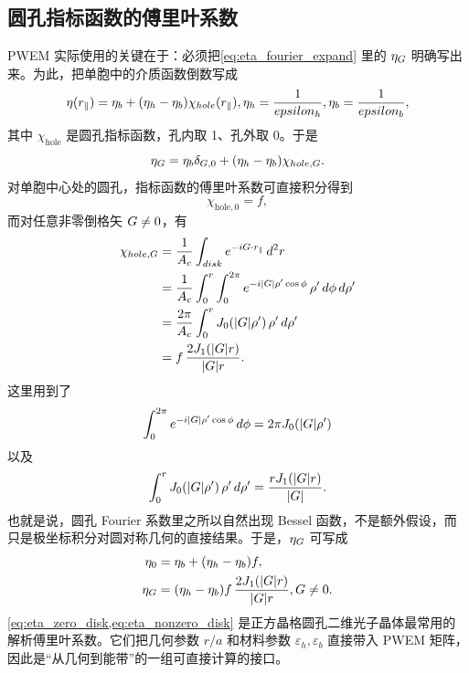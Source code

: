 \subsection{圆孔指标函数的傅里叶系数}
PWEM 实际使用的关键在于：必须把\cref{eq:eta_fourier_expand} 里的 $\eta_{G}$ 明确写出来。为此，把单胞中的介质函数倒数写成
\begin{equation}
\eta(\rvec_{\parallel})=
\eta_b + (\eta_h-\eta_b)\chi_{\mathrm{hole}}(\rvec_{\parallel}),
\qquad
\eta_h=\frac{1}{\varepsilon_h},\quad
\eta_b=\frac{1}{\varepsilon_b},
\label{eq:eta_indicator_disk}
\end{equation}
其中 $\chi_{\mathrm{hole}}$ 是圆孔指标函数，孔内取 1、孔外取 0。于是
\begin{equation}
\eta_{G}
=
\eta_b\delta_{G,0}
+
(\eta_h-\eta_b)
\chi_{hole,G}.
\label{eq:eta_g_from_indicator}
\end{equation}
对单胞中心处的圆孔，指标函数的傅里叶系数可直接积分得到
\begin{equation}
\chi_{\mathrm{hole},0}=f,
\label{eq:chi_disk_zero}
\end{equation}
而对任意非零倒格矢 $G\neq 0$，有
\begin{equation}
\begin{aligned}
\chi_{hole,G}
&=
\frac{1}{A_c}\int_{disk} e^{-iG\cdot r_{\parallel}}\,d^2r \\
&=
\frac{1}{A_c}\int_0^r\int_0^{2\pi}
e^{-i|G|\rho'\cos\phi}\,
\rho'\,d\phi\,d\rho' \\
&=
\frac{2\pi}{A_c}\int_0^r J_0(|G|\rho')\,\rho'\,d\rho' \\
&=
f\,\frac{2J_1(|G|r)}{|G|r}.
\end{aligned}
\label{eq:disk_indicator_fourier}
\end{equation}
这里用到了
\[
\int_0^{2\pi}e^{-i|G|\rho'\cos\phi}\,d\phi
=
2\pi J_0(|G|\rho')
\]
以及
\[
\int_0^r J_0(|G|\rho')\,\rho'\,d\rho'
=
\frac{rJ_1(|G|r)}{|G|}.
\]
也就是说，圆孔 Fourier 系数里之所以自然出现 Bessel 函数，不是额外假设，而只是极坐标积分对圆对称几何的直接结果。于是，$\eta_{G}$ 可写成
\begin{align}
\eta_0 &= \eta_b+(\eta_h-\eta_b)f,
\label{eq:eta_zero_disk}
\\
\eta_{G} &= (\eta_h-\eta_b)
 f\,\frac{2J_1(|G|r)}{|G|r},
 G\neq 0.
\label{eq:eta_nonzero_disk}
\end{align}
\cref{eq:eta_zero_disk,eq:eta_nonzero_disk} 是正方晶格圆孔二维光子晶体最常用的解析傅里叶系数。它们把几何参数 $r/a$ 和材料参数 $\varepsilon_h,\varepsilon_b$ 直接带入 PWEM 矩阵，因此是“从几何到能带”的一组可直接计算的接口。

